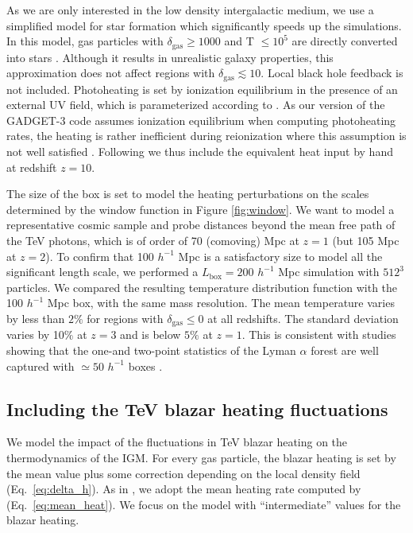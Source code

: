 \documentclass[numberedappendix]{emulateapj}
\newcommand\Ec[1]{{\color{magenta} \bf #1}} %
\begin{document}
As we are only interested in the low density intergalactic medium, we use a simplified model for star formation which significantly speeds up the simulations. In this model, gas particles with $\delta_{\mathrm{gas}}\geq 1000$ and T $\leq 10^5$ are directly converted into stars \citep{2004MNRAS.354..684V}. Although it results in unrealistic galaxy properties, this approximation does not affect regions with \Ec{$\delta_{\mathrm{gas}} \lesssim 10$}. Local black hole feedback is not included. Photoheating is set by ionization equilibrium in the presence of an external UV field, which is parameterized according to \citet{2009ApJ...703.1416F}. As our version of the \textsc{GADGET-3} code assumes ionization equilibrium when computing photoheating rates, the heating is rather inefficient during reionization where this assumption is not well satisfied \citep[see e.g.][]{2014arXiv1410.1531P}. Following \citet{2012MNRAS.423..149P} we thus include the equivalent heat input by hand at redshift $z=10$.

The size of the box is set to model the heating perturbations on the scales determined by the window function in Figure \ref{fig:window}. We want to model a representative cosmic sample and probe distances beyond the mean free path of the TeV photons, which is of order of 70 (comoving) Mpc at $z=1$ (but 105 Mpc at $z=2$). To confirm that 100 $h^{-1}$ Mpc is a satisfactory size to model all the significant length scale, we performed a $L_\mathrm{box}=200 $ $h^{-1}$ Mpc simulation with $512^3$ particles. We compared the resulting temperature distribution function with the 100 $h^{-1}$ Mpc box, with the same mass resolution. The mean temperature varies by less than $2\%$ for regions with $\delta_{\mathrm{gas}}\leqslant 0$ at all redshifts. The standard deviation varies by 10$\%$ at $z=3$ and is below $5\%$ at $z=1$. This is consistent with studies showing that the one-and two-point statistics of the Lyman $\alpha$ forest are well captured with $\simeq 50$ $h^{-1}$ boxes \citep{2007MNRAS.374..196R,2009MNRAS.398L..26B}.
\subsection{Including the TeV blazar heating fluctuations}
We model the impact of the fluctuations in TeV blazar heating on the thermodynamics of the IGM. For every gas particle, the blazar heating is set by the mean value plus some correction depending on the local density field (Eq.~\eqref{eq:delta_h}). As in \citet{2012MNRAS.423..149P}, we adopt the mean heating rate computed by \citet{2012ApJ...752...23C} (Eq.~\eqref{eq:mean_heat}). We focus on the model with ``intermediate'' values for the blazar heating.
\end{document}
